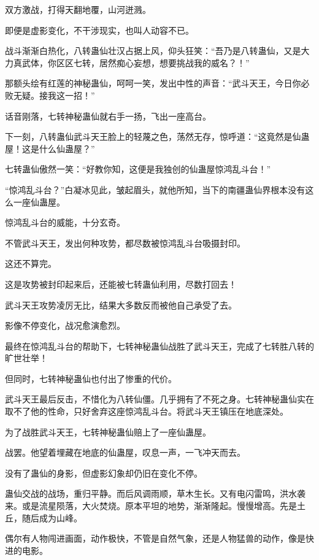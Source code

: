 
\begin{this_body}



双方激战，打得天翻地覆，山河迸溅。

即便是虚影变化，不干涉现实，也叫人动容不已。

战斗渐渐白热化，八转蛊仙壮汉占据上风，仰头狂笑：“吾乃是八转蛊仙，又是大力真武体，你区区七转，居然痴心妄想，想要挑战我的威名？！”

那额头绘有红莲的神秘蛊仙，呵呵一笑，发出中性的声音：“武斗天王，今日你必败无疑。接我这一招！”

话音刚落，七转神秘蛊仙就右手一扬，飞出一座高台。

下一刻，八转蛊仙武斗天王脸上的轻蔑之色，荡然无存，惊呼道：“这竟然是仙蛊屋！这是什么仙蛊屋？”

七转蛊仙傲然一笑：“好教你知，这便是我独创的仙蛊屋惊鸿乱斗台！”

“惊鸿乱斗台？”白凝冰见此，皱起眉头，就他所知，当下的南疆蛊仙界根本没有这么一座仙蛊屋。

惊鸿乱斗台的威能，十分玄奇。

不管武斗天王，发出何种攻势，都尽数被惊鸿乱斗台吸摄封印。

这还不算完。

这是攻势被封印起来后，还能被七转蛊仙利用，尽数打回去！

武斗天王攻势凌厉无比，结果大多数反而被他自己承受了去。

影像不停变化，战况愈演愈烈。

最终在惊鸿乱斗台的帮助下，七转神秘蛊仙战胜了武斗天王，完成了七转胜八转的旷世壮举！

但同时，七转神秘蛊仙也付出了惨重的代价。

武斗天王最后反击，不惜化为八转仙僵。几乎拥有了不死之身。七转神秘蛊仙实在取不了他的性命，只好舍弃这座惊鸿乱斗台。将武斗天王镇压在地底深处。

为了战胜武斗天王，七转神秘蛊仙赔上了一座仙蛊屋。

战罢。他望着埋藏在地底的仙蛊屋，叹息一声，一飞冲天而去。

没有了蛊仙的身影，但虚影幻象却仍旧在变化不停。

蛊仙交战的战场，重归平静。而后风调雨顺，草木生长。又有电闪雷鸣，洪水袭来。或是流星陨落，大火焚烧。原本平坦的地势，渐渐隆起。慢慢增高。先是土丘，随后成为山峰。

偶尔有人物闯进画面，动作极快，不管是自然气象，还是人物猛兽的动作，像是快进的电影。


\end{this_body}
